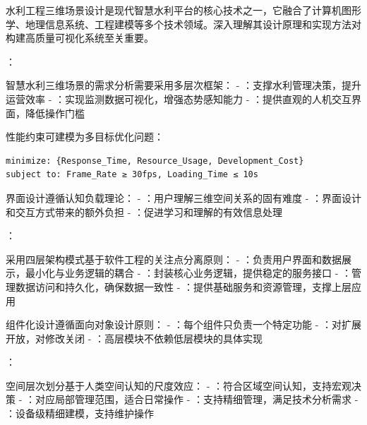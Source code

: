 水利工程三维场景设计是现代智慧水利平台的核心技术之一，它融合了计算机图形学、地理信息系统、工程建模等多个技术领域。深入理解其设计原理和实现方法对构建高质量可视化系统至关重要。

：


智慧水利三维场景的需求分析需要采用多层次框架： - ：支撑水利管理决策，提升运营效率 - ：实现监测数据可视化，增强态势感知能力 - ：提供直观的人机交互界面，降低操作门槛


性能约束可建模为多目标优化问题：

\begin{lstlisting}
minimize: {Response_Time, Resource_Usage, Development_Cost}
subject to: Frame_Rate ≥ 30fps, Loading_Time ≤ 10s
\end{lstlisting}


界面设计遵循认知负载理论： - ：用户理解三维空间关系的固有难度 - ：界面设计和交互方式带来的额外负担 - ：促进学习和理解的有效信息处理

：


采用四层架构模式基于软件工程的关注点分离原则： - ：负责用户界面和数据展示，最小化与业务逻辑的耦合 - ：封装核心业务逻辑，提供稳定的服务接口 - ：管理数据访问和持久化，确保数据一致性 - ：提供基础服务和资源管理，支撑上层应用


组件化设计遵循面向对象设计原则： - ：每个组件只负责一个特定功能 - ：对扩展开放，对修改关闭 - ：高层模块不依赖低层模块的具体实现

：


空间层次划分基于人类空间认知的尺度效应： - ：符合区域空间认知，支持宏观决策 - ：对应局部管理范围，适合日常操作 - ：支持精细管理，满足技术分析需求 - ：设备级精细建模，支持维护操作

